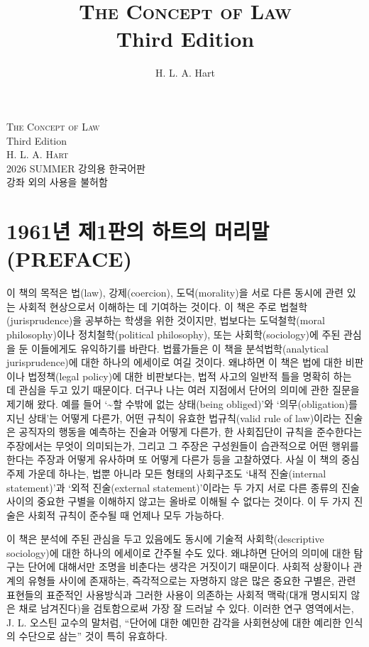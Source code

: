\documentclass[12pt, oneside]{book}  %
\title{\Huge\textsc{The Concept of Law} \\[2ex] \Large Third Edition}
\author{\Large H. L. A. Hart}
\date{}
\begin{document}
\begin{titlepage}
  \centering
  \vspace*{3cm}
  {\Huge\textsc{The Concept of Law}}\\[1.5ex]
  {\Large Third Edition}\\[4ex]
  \textsc{H. L. A. Hart}\\[6ex]
  {\small 2026 SUMMER 강의용 한국어판\\
  강좌 외의 사용을 불허함}
  \vfill
\end{titlepage}

\section{1961년 제1판의 하트의
머리말(PREFACE)}\label{uxb144-uxc81c1uxd310uxc758-uxd558uxd2b8uxc758-uxba38uxb9acuxb9d0preface}

이 책의 목적은 법(law), 강제(coercion), 도덕(morality)을 서로 다른
동시에 관련 있는 사회적 현상으로서 이해하는 데 기여하는 것이다. 이 책은
주로 법철학(jurisprudence)을 공부하는 학생을 위한 것이지만, 법보다는
도덕철학(moral philosophy)이나 정치철학(political philosophy), 또는
사회학(sociology)에 주된 관심을 둔 이들에게도 유익하기를 바란다.
법률가들은 이 책을 분석법학(analytical jurisprudence)에 대한 하나의
에세이로 여길 것이다. 왜냐하면 이 책은 법에 대한 비판이나 법정책(legal
policy)에 대한 비판보다는, 법적 사고의 일반적 틀을 명확히 하는 데 관심을
두고 있기 때문이다. 더구나 나는 여러 지점에서 단어의 의미에 관한 질문을
제기해 왔다. 예를 들어 `\textasciitilde 할 수밖에 없는 상태(being
obliged)'와 `의무(obligation)를 지닌 상태'는 어떻게 다른가, 어떤 규칙이
유효한 법규칙(valid rule of law)이라는 진술은 공직자의 행동을 예측하는
진술과 어떻게 다른가, 한 사회집단이 규칙을 준수한다는 주장에서는 무엇이
의미되는가, 그리고 그 주장은 구성원들이 습관적으로 어떤 행위를 한다는
주장과 어떻게 유사하며 또 어떻게 다른가 등을 고찰하였다. 사실 이 책의
중심 주제 가운데 하나는, 법뿐 아니라 모든 형태의 사회구조도 `내적
진술(internal statement)'과 `외적 진술(external statement)'이라는 두
가지 서로 다른 종류의 진술 사이의 중요한 구별을 이해하지 않고는 올바로
이해될 수 없다는 것이다. 이 두 가지 진술은 사회적 규칙이 준수될 때
언제나 모두 가능하다.

이 책은 분석에 주된 관심을 두고 있음에도 동시에 기술적
사회학(descriptive sociology)에 대한 하나의 에세이로 간주될 수도 있다.
왜냐하면 단어의 의미에 대한 탐구는 단어에 대해서만 조명을 비춘다는
생각은 거짓이기 때문이다. 사회적 상황이나 관계의 유형들 사이에 존재하는,
즉각적으로는 자명하지 않은 많은 중요한 구별은, 관련 표현들의 표준적인
사용방식과 그러한 사용이 의존하는 사회적 맥락(대개 명시되지 않은 채로
남겨진다)을 검토함으로써 가장 잘 드러날 수 있다. 이러한 연구 영역에서는,
J. L. 오스틴 교수의 말처럼, ``단어에 대한 예민한 감각을 사회현상에 대한
예리한 인식의 수단으로 삼는'' 것이 특히 유효하다.
\end{document}
